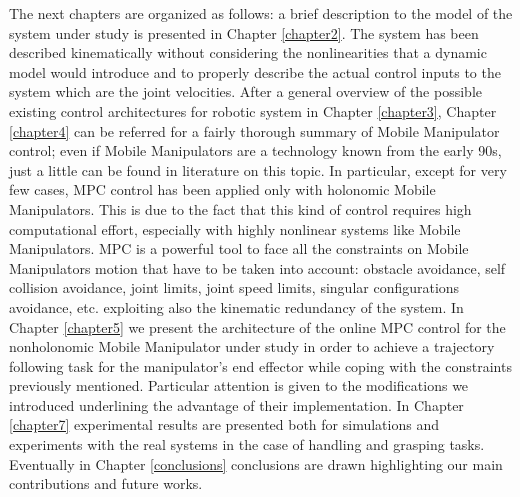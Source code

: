 The next chapters are organized as follows: a brief description to the model of the system under study is presented in Chapter \ref{chapter2}. The system has been described kinematically without considering the nonlinearities that a dynamic model would introduce and to properly describe the actual control inputs to the system which are the joint velocities. After a general overview of the possible existing control architectures for robotic system in Chapter \ref{chapter3}, Chapter \ref{chapter4} can be referred for a fairly thorough summary of Mobile Manipulator control; even if Mobile Manipulators are a technology known from the early 90s, just a little can be found in literature on this topic. In particular, except for very few cases, MPC control has been applied only with holonomic Mobile Manipulators. This is due to the fact that this kind of control requires high computational effort, especially with highly nonlinear systems like Mobile Manipulators. MPC is a powerful tool to face all the constraints on Mobile Manipulators motion that have to be taken into account: obstacle avoidance, self collision avoidance, joint limits, joint speed limits, singular configurations avoidance, etc. exploiting also the kinematic redundancy of the system.
In Chapter \ref{chapter5} we present the architecture of the online MPC control for the nonholonomic Mobile Manipulator under study in order to achieve a trajectory following task for the manipulator's end effector while coping with the constraints previously mentioned. Particular attention is given to the modifications we introduced underlining the advantage of their implementation. In Chapter \ref{chapter7} experimental results are presented both for simulations and experiments with the real systems in the case of handling and grasping tasks. Eventually in Chapter \ref{conclusions} conclusions are drawn highlighting our main contributions and future works.	

















